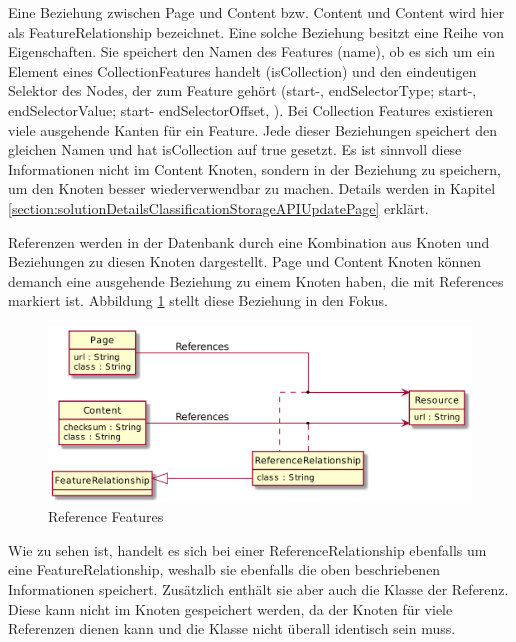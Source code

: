     Eine Beziehung zwischen Page und Content bzw. Content und Content
    wird hier als FeatureRelationship bezeichnet.
    Eine solche Beziehung besitzt eine Reihe von Eigenschaften.
    Sie speichert den Namen des Features (name),
    ob es sich um ein Element eines CollectionFeatures handelt (isCollection)
    und den eindeutigen Selektor des Nodes, der zum Feature gehört
    (start-, endSelectorType; start-, endSelectorValue; start- endSelectorOffset, ).
    Bei Collection Features existieren viele ausgehende Kanten für ein Feature.
    Jede dieser Beziehungen speichert den gleichen Namen und hat isCollection auf true gesetzt.
    Es ist sinnvoll diese Informationen nicht im Content Knoten, sondern in der Beziehung zu speichern,
    um den Knoten besser wiederverwendbar zu machen.
    Details werden in Kapitel \ref{section:solutionDetailsClassificationStorageAPIUpdatePage} erklärt.

    Referenzen werden in der Datenbank durch eine Kombination aus
    {\resource} Knoten und Beziehungen zu diesen Knoten dargestellt.
    Page und Content Knoten können demanch eine ausgehende Beziehung zu einem
    {\resource} Knoten haben, die mit References markiert ist.
    Abbildung \ref{image:dbDataModelResourceRelationship} stellt diese Beziehung in den Fokus.

    \begin{figure}
        \centering
        \includegraphics[width=\textwidth]{../resources/db-data-model/resource-relationship.png}
        \caption{Reference Features}
        \label{image:dbDataModelResourceRelationship}
    \end{figure}

    Wie zu sehen ist, handelt es sich bei einer ReferenceRelationship ebenfalls
    um eine FeatureRelationship, weshalb sie ebenfalls die oben beschriebenen Informationen speichert.
    Zusätzlich enthält sie aber auch die Klasse der Referenz.
    Diese kann nicht im {\resource} Knoten gespeichert werden,
    da der Knoten für viele Referenzen dienen kann und die Klasse nicht überall identisch sein muss.